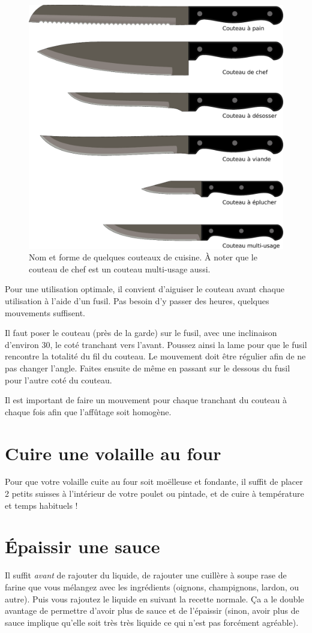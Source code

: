 \documentclass[a4paper,twoside]{report}
\begin{document}
\begin{figure}[htb]
\centering
\includegraphics[width=0.6\linewidth]{figures/couteaux.pdf}
\caption{Nom et forme de quelques couteaux de cuisine. À noter que le couteau de chef est un couteau multi-usage aussi.}
\end{figure}

\begin{remarque}
Pour une utilisation optimale, il convient d'aiguiser le couteau avant chaque utilisation à l'aide d'un fusil. Pas besoin d'y passer des heures, quelques mouvements suffisent.

Il faut poser le couteau (près de la garde) sur le fusil, avec une inclinaison d'environ 30\degre, le coté tranchant vers l'avant. Poussez ainsi la lame pour que le fusil rencontre la totalité du fil du couteau. Le mouvement doit être régulier afin de ne pas changer l'angle. Faites ensuite de même en passant sur le dessous du fusil pour l'autre coté du couteau.

Il est important de faire un mouvement pour chaque tranchant du couteau à chaque fois afin que l'affûtage soit homogène.
\end{remarque}


\section{Cuire une volaille au four}
Pour que votre volaille cuite au four soit moëlleuse et fondante, il suffit de placer 2 petits suisses à l'intérieur de votre poulet ou pintade, et de cuire à température et temps habituels !

\section{Épaissir une sauce}
Il suffit \emph{avant} de rajouter du liquide, de rajouter une cuillère à soupe rase de farine que vous mélangez avec les ingrédients (oignons, champignons, lardon, ou autre). Puis vous rajoutez le liquide en suivant la recette normale. Ça a le double avantage de permettre d'avoir plus de sauce et de l'épaissir (sinon, avoir plus de sauce implique qu'elle soit très très liquide ce qui n'est pas forcément agréable).
\end{document}
